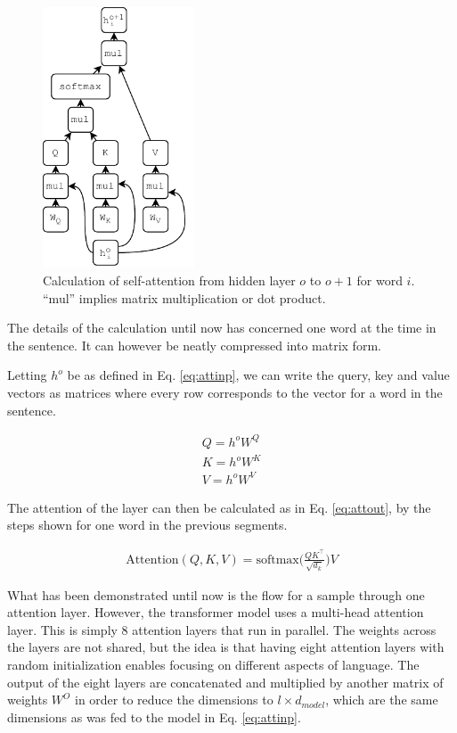 \begin{figure}[ht]
    \centering
    \includegraphics[width=0.4\textwidth]{Figures/figs-self-att.pdf}
    \caption{Calculation of self-attention from hidden layer $o$ to $o+1$ for word $i$. ``mul'' implies matrix multiplication or dot product. }
    \label{fig:attflow}
\end{figure}

The details of the calculation until now has concerned one word at the time in the sentence. It can however be neatly compressed into matrix form.

Letting $h^o$ be as defined in Eq. \ref{eq:attinp}, we can  write the query, key and value vectors as matrices where every row corresponds to the vector for a word in the sentence. 

\begin{align}
    Q = h^o W^Q \\
    K = h^o W^K \\
    V = h^o W^V
\end{align}

The attention of the layer can then be calculated as in Eq. \ref{eq:attout}, by the steps shown for one word in the previous segments. 

\begin{align}
    \text{Attention}(Q,K,V) = \text{softmax}\Big( \frac{Q K^\intercal}{\sqrt{d_k}}\Big) V
    \label{eq:attout}
\end{align}

What has been demonstrated until now is the flow for a sample through one attention layer. However, the transformer model uses a multi-head attention layer. This is simply 8 attention layers that run in parallel. The weights across the layers are not shared, but the idea is that having eight attention layers with random initialization enables focusing on different aspects of language. The output of the eight layers are concatenated and multiplied by another matrix of weights $W^O$ in order to reduce the dimensions to $l \times d_{model}$, which are the same dimensions as was fed to the model in Eq. \ref{eq:attinp}. 

